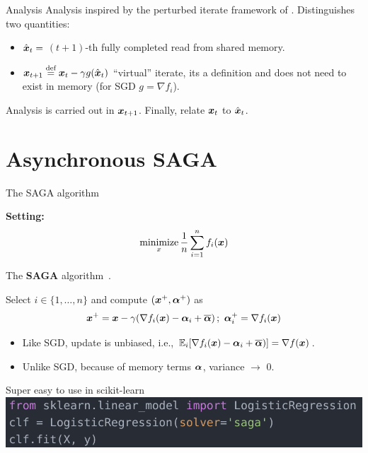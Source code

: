 \documentclass[10pt]{beamer}
\let\oldparencite=\parencite
\renewcommand{\parencite}[1]{\textcolor[rgb]{1.,.9,.9}{\oldparencite{#1}}}
\begin{document}
\begin{frame}{Analysis}
Analysis inspired by the perturbed iterate framework of \parencite{mania2015perturbed}. Distinguishes two quantities:
\begin{itemize}
\item $\hat{{\boldsymbol x}}_t =$ $(t+1)$-th fully completed read from shared memory. 
\item ${\boldsymbol x}_{t+1} \stackrel{\text{def}}{=} {\boldsymbol x}_{t} - \gamma g(\hat{{\boldsymbol x}}_t)$ ``virtual'' iterate, its a definition and does not need to exist in memory (for SGD $g = \nabla f_i$).
\end{itemize}

Analysis is carried out in ${\boldsymbol x}_{t+1}$. Finally,
relate ${\boldsymbol x}_t$ to $\hat{{\boldsymbol x}}_t$.
\end{frame}

\section{Asynchronous SAGA}


\begin{frame}{The SAGA algorithm}

{\bfseries Setting:}
$$
\operatorname*{minimize}_x \frac{1}{n} \sum_{i=1}^n f_i({\boldsymbol x})
$$ 

The {\bfseries SAGA} algorithm~\parencite{defazio2014saga}.

Select $i \in \{1, \ldots, n\}$ and compute $({\boldsymbol x}^+, {\boldsymbol \alpha}^+)$ as
$$
{\boldsymbol x}^+ = {\boldsymbol x} - \gamma (\nabla f_i({\boldsymbol x}) - {\boldsymbol \alpha}_i + \overline{{\boldsymbol \alpha}})\,;~{\boldsymbol \alpha}_i^+ = \nabla f_i({\boldsymbol x})
$$
\begin{itemize}
\item Like SGD, update is unbiased, i.e., $\mathbb{E}_i[\nabla f_i({\boldsymbol x}) - {\boldsymbol \alpha}_i + \overline{{\boldsymbol \alpha}})] = \nabla f({\boldsymbol x})$.

\item Unlike SGD, because of memory terms ${\boldsymbol \alpha}$, variance $\rightarrow$ 0.
\end{itemize}
\vspace{1em}\pause

\begin{alertblock}{Super easy to use in scikit-learn}
\includegraphics[width=0.8\linewidth]{img/code}
\end{alertblock}
\end{frame}
\end{document}
